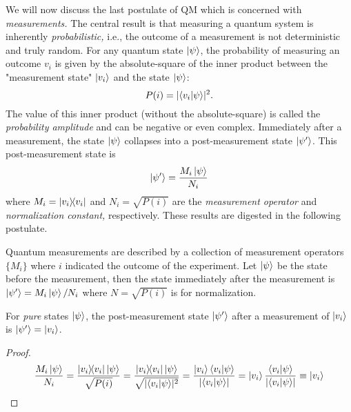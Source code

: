 		We will now discuss the last postulate of \ac{QM} which is concerned with \emph{measurements.} The central result is that measuring a quantum system is inherently \emph{probabilistic,} i.e., the outcome of a measurement is not deterministic and truly random. For any quantum state \( \ket{\psi} \), the probability of measuring an outcome \(v_i\) is given by the absolute-square of the inner product between the "measurement state" \(\ket{v_i}\) and the state \(\ket{\psi}\):
		\begin{equation}
			P(i) = \lvert \ip{v_i}{\psi} \rvert^2.
		\end{equation}
		The value of this inner product (without the absolute-square) is called the \emph{probability amplitude} and can be negative or even complex. Immediately after a measurement, the state \(\ket{\psi}\) collapses into a post-measurement state \(\ket{\psi'}\). This post-measurement state is
		\begin{equation}
			\ket{\psi'} = \frac{M_i \ket{\psi}}{N_i}
		\end{equation}
		where \( M_i = \op{v_i}{v_i} \) and \( N_i = \sqrt{P(i)} \) are the \emph{measurement operator} and \emph{normalization constant,} respectively. These results are digested in the following postulate.

		\begin{postulate}
			Quantum measurements are described by a collection of measurement operators \( \{ M_i \} \) where \(i\) indicated the outcome of the experiment. Let \(\ket{\psi}\) be the state before the measurement, then the state immediately after the measurement is \( \ket{\psi'} = M_i \ket{\psi} / N_i \) where \( N = \sqrt{P(i)} \) is for normalization.
		\end{postulate}

		\begin{theorem}
			For \emph{pure} states \(\ket{\psi}\), the post-measurement state \(\ket{\psi'}\) after a measurement of \(\ket{v_i}\) is \(\ket{\psi'} = \ket{v_i}\).
		\end{theorem}
		\begin{proof}
			\begin{equation}
				\frac{M_i \ket{\psi}}{N_i}
					= \frac{\op{v_i}{v_i} \ket{\psi}}{\sqrt{P(i)}}
					= \frac{\op{v_i}{v_i} \ket{\psi}}{\sqrt{\lvert \ip{v_i}{\psi} \rvert^2}}
					= \frac{\ket{v_i} \ip{v_i}{\psi}}{\lvert \ip{v_i}{\psi} \rvert}
					= \ket{v_i} \frac{\ip{v_i}{\psi}}{\lvert \ip{v_i}{\psi} \rvert}
					\equiv \ket{v_i}
			\end{equation}
		\end{proof}

